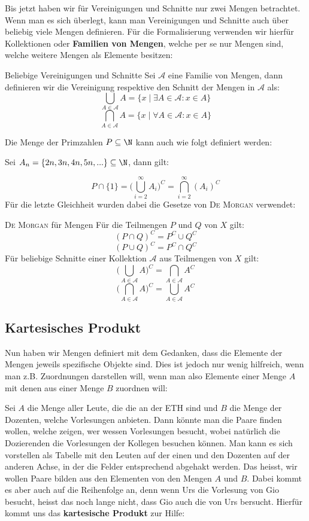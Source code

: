 Bis jetzt haben wir für Vereinigungen und Schnitte nur zwei Mengen betrachtet. Wenn man es sich überlegt, kann man Vereinigungen und Schnitte auch über beliebig viele Mengen definieren. Für die Formalisierung verwenden wir hierfür Kollektionen oder \textbf{Familien von Mengen}, welche per se nur Mengen sind, welche weitere Mengen als Elemente besitzen:
\begin{definition}{Beliebige Vereinigungen und Schnitte}{}
Sei $\mathcal{A}$ eine Familie von Mengen, dann definieren wir die Vereinigung respektive den Schnitt der Mengen in $\mathcal{A}$ als:
$$\bigcup_{A \in \mathcal{A}} A = \{x \mid \exists A \in \mathcal{A} : x \in A\}$$
$$\bigcap_{A \in \mathcal{A}} A = \{x \mid \forall A \in \mathcal{A} : x \in A\}$$
\end{definition}
\begin{example} Die Menge der Primzahlen $P \subseteq \N$ kann auch wie folgt definiert werden:

Sei $A_n = \{2n, 3n, 4n, 5n, ...\} \subseteq \N$, dann gilt:

$$P \cap \{1\} = \Big(\bigcup_{i = 2}^\infty A_i\Big)^C = \bigcap_{i = 2}^\infty (A_i)^C$$
Für die letzte Gleichheit wurden dabei die Gesetze von \textsc{De Morgan} verwendet:
\end{example}

\begin{definition}{\textsc{De Morgan} für Mengen}{}
Für die Teilmengen $P$ und $Q$ von $X$ gilt:
$$(P \cap Q)^C = P^C \cup Q^C$$
$$(P \cup Q)^C = P^C \cap Q^C$$
Für beliebige Schnitte einer Kollektion $\mathcal{A}$ aus Teilmengen von $X$ gilt:
$$\Big(\bigcup_{A \in \mathcal{A}} A\Big)^C = \bigcap_{A \in \mathcal{A}} A^C$$
$$\Big(\bigcap_{A \in \mathcal{A}} A\Big)^C = \bigcup_{A \in \mathcal{A}} A^C$$
\end{definition}

\subsection{Kartesisches Produkt}
Nun haben wir Mengen definiert mit dem Gedanken, dass die Elemente der Mengen jeweils spezifische Objekte sind. Dies ist jedoch nur wenig hilfreich, wenn man z.B. Zuordnungen darstellen will, wenn man also Elemente einer Menge $A$ mit denen aus einer Menge $B$ zuordnen will:

\begin{example} [ ]
Sei $A$ die Menge aller Leute, die die an der ETH sind und $B$ die Menge der Dozenten, welche Vorlesungen anbieten. Dann könnte man die Paare finden wollen, welche zeigen, wer wessen Vorlesungen besucht, wobei natürlich die Dozierenden die Vorlesungen der Kollegen besuchen können. Man kann es sich vorstellen als Tabelle mit den Leuten auf der einen und den Dozenten auf der anderen Achse, in der die Felder entsprechend abgehakt werden. Das heisst, wir wollen Paare bilden aus den Elementen von den Mengen $A$ und $B$. Dabei kommt es aber auch auf die Reihenfolge an, denn wenn Urs die Vorlesung von Gio besucht, heisst das noch lange nicht, dass Gio auch die von Urs bersucht. Hierfür kommt uns das \textbf{kartesische Produkt} zur Hilfe:
\end{example}

